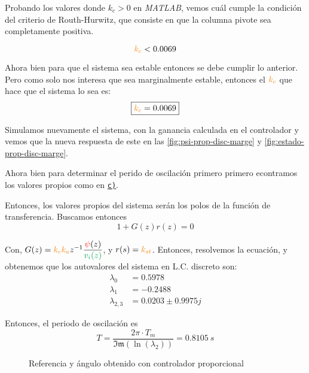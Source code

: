 Probando los valores donde \( k_c > 0 \) en \textit{MATLAB}, vemos cuál cumple la condición del criterio de Routh-Hurwitz, que consiste en que la columna pivote sea completamente positiva.

\begin{equation}
    \nara{k_{c}}  < 0.0069
\end{equation}

Ahora bien para que el sistema sea estable entonces se debe cumplir lo anterior. Pero 
como solo nos interesa que sea marginalmente estable, entonces el $\nara{k_{c}}$
que hace que el sistema lo sea es:
\begin{equation}
    \boxed{\nara{k_c} = 0.0069}
\end{equation}

Simulamos nuevamente el sistema, con la ganancia calculada en el controlador y
vemos que la nueva respuesta de este en las \autoref{fig:psi-prop-disc-marge} y
\autoref{fig:estado-prop-disc-marge}.

Ahora bien para determinar el perido de oscilación primero primero econtramos los valores propios como en  \hyperref[pregunta-c]{\texttt{c)}}.

Entonces, los valores propios del sistema serán los polos de la función de
transferencia. Buscamos entonces
\begin{equation}
  1 + G(z)r(z) = 0
\end{equation}

Con, $G(z) =  \nara{k_{c} k_{a}} z^{-1} \dfrac{\rojo{\psi}(z)}{\verd{v_{i}(z)}}$, y
$r(s) = \nara{k_{st}}$. Entonces, resolvemos la ecuación, y obtenemos que los
autovalores del sistema en L.C. discreto son:
\begin{align*}
  \lambda_{0} &= 0.5978\\
  \lambda_{1} &= -0.2488\\
  \lambda_{2,3} &= 0.0203 \pm 0.9975j
\end{align*}

Entonces, el periodo de oscilación es
\begin{equation}
    T = \frac{2\pi \cdot T_{m}}{\mathfrak{Im}(\ln(\lambda_{2}))} = 0.8105\ \unit{s} 
\end{equation}

\begin{figure}[h]
    \centering
    
    \caption{Referencia y ángulo obtenido con controlador proporcional}\label{fig:psi-prop-disc-marge}
\end{figure}

